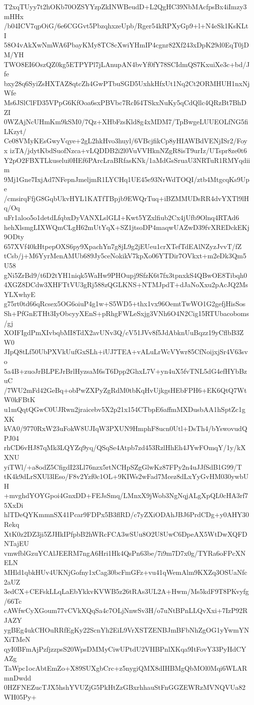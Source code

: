 T2xqTUyy7t2hOKb70OZSYYzpZkINWBeudD+L2QgHC39NbMAcfpsBx4iImzy3mHHx
/b04ICV7qpOiG/6e6CGGvt5PbzqhxzeUpb/Rger54kRPXyGp9+l+N4eSk1KsKLtI
58O4vAkXwNmWA6PbayKMy8TC8cXwiYHmIP4cgnr82Xf243xDpK29d0EqT0jDM/YH
TWO8EI6OszQZ0kg5ETPYPl7jLAnupAN4bvYf0fY78SCIdmQS7KxuiXe3c+bd/Jfe
bxy28q6SyiZsHXTAZ8qtcZh4GwPTbuSGD5UxhkHfxUt1Nq2Ct2ORMHUH1nxNjWfe
Ms6JSlClFD35VPpG6KfOoa6sxPBVbc7RcI64TSkxNuKy5qCdQllc4QRzBt7BhDZI
0WZAjNcUHmKm9kSM0/7Qz+XHbFzsKld8g4xMDM7/TpBwgeLUUEOLfNG5fiLKzyt/
Ce08VMyKEsGwyVqye+2gL2hkHvo3huyl/6VBcjfikCp8yHIAWBdVENjISr2/Foyx
izTA/jdytKbdSuofNzca+vLQDDB2i2l0VuVVHknNZgR8isT9urIz/UTspr8ze0t6
Y2pO2FBXTLkuselui0HEf6PArcLraBRfasKNk/1aMdGsSruaU3NRTuR1RMYqdiim
9Mj1Gne7IxjAd7NFepnJmeljmR1LYCHq1UE45e93NrWdTOQI/ztb4MtgcqKs9Upe
/cmsirqFfjG8GqbUkvHYL1KATfTBpjb9EWQrTuq+iBZMMUDsRR4dvYXTl9lHq/Oq
uFr1aloo5o1detdLfqbxDyVANXLslGLI+Kwt5YZxlfiub2Cx4jUfb9Olnq4RTAd6
hehXlsmgLIXWQmCLgH62mUtYqX+SZ1jtsoDP4maqwUAZwD39fvXREDckEKj9ODty
657XVf40kHtpepOXS6py9XpachYn7g8jL9g2jEUeu1crXTefTdEAlNZyzJvvT/fZ
tCsb/j+M6YyrMenAMUb689Jy5ceNokikV7kpXo06YTDir7OVkxt+m2eDk3Qm5U58
gNi5ZrBd9/t6D2tYH1niqk5WaHw9PHOupj9SfzK6t7fx3tpnxkS4QBwOE8Tibqh0
4XGZ8DCdw3XHFTtVU3gRj588zQGLKNS+NTMJpdT+dJaNoXxu2pAcJQ2MsYLXwhyE
g75rt0td66qRcsex5OG6oiuP4g1w+S5WD5+thx1vx96OemtTwWO1G2gefjHisSos
Sh+PfGnETHt3IyObcyyXEnS+pRhgFWLeSxjg3VNh6O4N2Cig15RTUbacoboms/gj
XOIFIgdPmXIvbqbMI8TdX2avUNv3Q/cV51JVv8f5JdAbknUuBqzz19yCflbB3ZW0
JIpQ8tLf50UbPXVkUufGxSLh+iUJ7TEA+vALuLrWcVYwr85CfNoijxjSr4V63svo
5a4B+zuoJrBLPEJrBrlHyzsaM6sT6Dpp2GhxL7V+yn4uX5fvTNL5dG4efHYbBzuC
/7WU2mFd42GeBq+obPwZXPyZgRdM0tbKqHvUjkgsHEbFPH6+EK6QtQ7WtW0kFBtK
u1mQqtQGwC0UJRwn2jraicebv5X2p21x154CTbpE6affmMXDusbAA1hSptZc1gXK
kVA0/9770RxW23uFokW8UJIqW3PXUN9HmphF8ucn0Utl+DsTh4/bYswovudQPJ04
rhCD6vHJ87qMk3LQYZq9yq/QSqSe4Atpb7zd453RzlHhEh4JYwFOmqY/1y/kXXNU
yiTWl/+a8odZ5CfigdI23Ll76nzx5rtNCHpSZgGlwKz87FPy2n4uJJfSdB1G99/T
tK4k9dLrSXUl3lEso/F8v2Yzf0c1OL+9KIWs2wFad7Mcez8dLxYyGvHM030ywbUH
+mvghdYOYGpoi4GnxDD+FEJsSmq/LMnxX9jWob3NgNqjALgXpQL0cHA3rf75XxDi
hlTDeQYKmmnSX41Pcar9FDPx5B3flRD/c7yZXiODAhJBJ6PrdCDg+y0AHY30Rekq
XtK0z2DZ3ji5ZJHkIPfpbB2hWRcFCA3wSUu8O2U8UwC6DpeAX5WtDwXQFDNTajEU
vmwfblGzuYCAlJEERM7ngA6Hri1Hk4QsPn63be/7i9m7D7x0g/TYRa6oFPcXNELN
MHld1qbkHUv4UKNjGofny1xCag30bcFmGFz+vu41qWemAlm9KXZq3OSUaNfc2aUZ
3edCX+CEFskLLqLaEbYkkvKVWB5z26tRAs3UL2A+Hwm/Ms5kdF9T8PKvyfg/66Tc
cAWfwCyXGoum77vCVkXQqSa4c7OLjNnwSv3H/o7uNtBPnLLQvXxi+7IzP92RJAZY
ygBEg4ukCHOuRRfEgKy22ScnYh2EiL9VrXSTZENBJmBFbNhZgOG1yYwmYNXiTMeN
qyI0BFmAjPzfjzzpsS20WpsDMMyCiwUPtdU2VHBPnlXKqa9ItFovY33PyHdCYAZg
TaWpc1ocAbtEmZo+X89SUXgbCrc+z5nygiQMX8dIHBMgQbMOl0Mqi6WLARmnDwdd
0HZFNEZucTJX5hshYVUZjG5PkHtZzGBxrhhauStFnGGZEWRzMVNQVUa82WH05Py+
